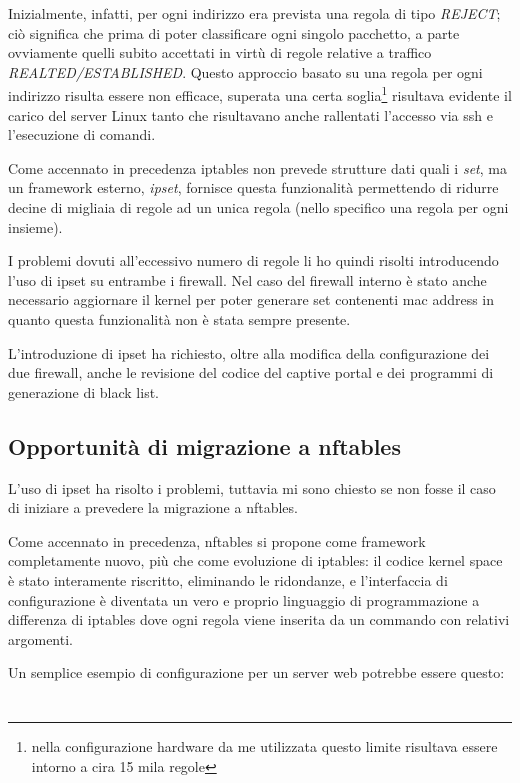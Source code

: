 Inizialmente, infatti, per ogni indirizzo era prevista una regola di tipo {\em
REJECT}; ciò significa che prima di poter classificare ogni singolo pacchetto,
a parte ovviamente quelli subito accettati in virtù di regole relative a
traffico {\em REALTED/ESTABLISHED}.  Questo approccio basato su una regola
per ogni indirizzo risulta essere non efficace, superata una certa
soglia\footnote{nella configurazione hardware da me utilizzata questo limite
risultava essere intorno a cira 15 mila regole} risultava evidente il carico
del server Linux tanto che risultavano anche rallentati l'accesso via ssh e
l'esecuzione di comandi.

Come accennato in precedenza iptables non prevede strutture dati quali i {\em
set}, ma un framework esterno, {\em ipset}, fornisce questa funzionalità
permettendo di ridurre decine di migliaia di regole ad un unica regola (nello
specifico una regola per ogni insieme).

I problemi dovuti all'eccessivo numero di regole li ho quindi risolti
introducendo l'uso di ipset su entrambe i firewall.  Nel caso del firewall
interno è stato anche necessario aggiornare il kernel per poter generare set
contenenti mac address in quanto questa funzionalità non è stata sempre
presente.

L'introduzione di ipset ha richiesto, oltre alla modifica della configurazione
dei due firewall, anche le revisione del codice del captive portal e dei
programmi di generazione di black list.

\section{Opportunità di migrazione a nftables}

L'uso di ipset ha risolto i problemi, tuttavia mi sono chiesto se non fosse il
caso di iniziare a prevedere la migrazione a nftables.

Come accennato in precedenza, nftables si propone come framework completamente
nuovo, più che come evoluzione di iptables: il codice kernel space è stato
interamente riscritto, eliminando le ridondanze, e l'interfaccia di
configurazione è diventata un vero e proprio linguaggio di programmazione a
differenza di iptables dove ogni regola viene inserita da un commando con
relativi argomenti.

Un semplice esempio di configurazione per un server web potrebbe essere
questo:




\chapter{}
